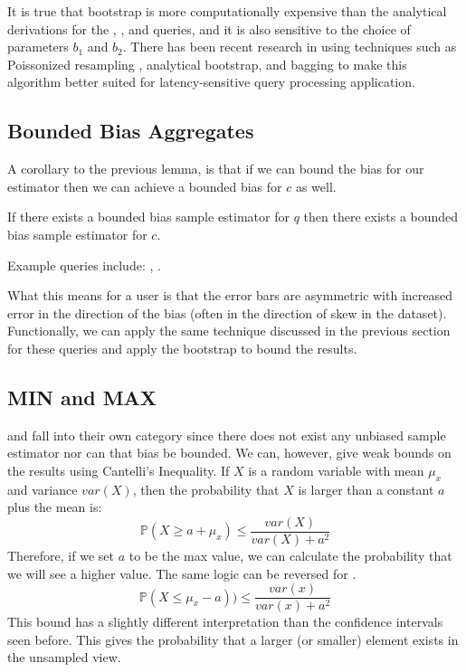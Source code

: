It is true that bootstrap is more computationally expensive than the analytical derivations for the \sumfunc, \countfunc, and \avgfunc queries, and it is also sensitive to the choice of parameters $b_1$ and $b_2$.
There has been recent research in using techniques such as Poissonized resampling \cite{agarwalknowing}, analytical bootstrap\cite{DBLP:conf/sigmod/ZengGMZ14}, and bagging \cite{DBLP:conf/kdd/KleinerTASJ13} to make this algorithm better suited for latency-sensitive query processing application.

\subsection{Bounded Bias Aggregates}

A corollary to the previous lemma, is that if we can bound the bias for our estimator then we can achieve a bounded bias for $c$ as well.
\begin{corollary}
If there exists a bounded bias sample estimator for $q$ then there exists a bounded bias sample estimator for $c$.
\end{corollary}
Example queries include: \medfunc, \percfunc.

What this means for a user is that the error bars are asymmetric with increased error in the direction of the bias (often in the direction of skew in the dataset).
Functionally, we can apply the same technique discussed in the previous section for these queries and apply the bootstrap to bound the results. 

\subsection{MIN and MAX}

\minfunc and \maxfunc fall into their own category since there does not exist any unbiased sample estimator nor can that bias be bounded.
We can, however, give weak bounds on the results using Cantelli's Inequality.
If $X$ is a random variable with mean $\mu_x$ and variance $var(X)$, then the probability that $X$ is larger than a constant $a$  plus the mean is:
\[
\mathbb{P}(X \ge a + \mu_x ) \le \frac{var(X)}{var(X) + a^2}
\]
Therefore, if we set $a$ to be the max value, we can calculate the probability that we will see a higher value. The same logic can be reversed for \minfunc.
\[
\mathbb{P}(X \le \mu_x - a )) \le \frac{var(x)}{var(x) + a^2}
\]
This bound has a slightly different interpretation than the confidence intervals seen before.
This gives the probability that a larger (or smaller) element exists in the unsampled view.

